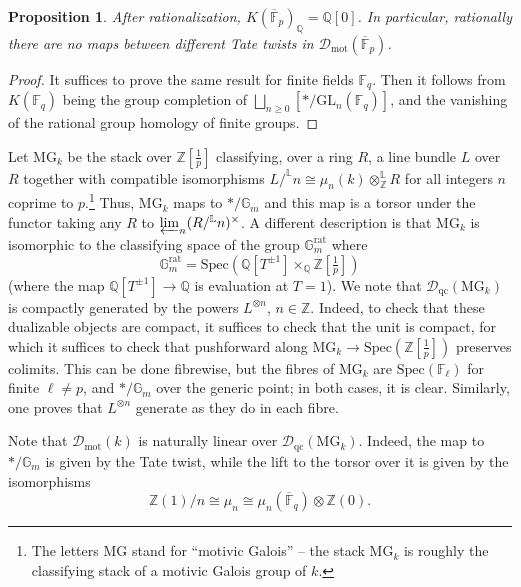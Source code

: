 \documentclass[11pt]{amsart}
\newcommand{\dotimes}{\otimes^{\mathbb L}}
\numberwithin{equation}{section}
\numberwithin{theorem}{section}
\newtheorem{proposition}[theorem]{Proposition}
\theoremstyle{definition}
\begin{document}
\begin{proposition} After rationalization, $K(\overline{\mathbb F}_p)_{\mathbb Q} = \mathbb Q[0]$. In particular, rationally there are no maps between different Tate twists in $\mathcal D_{\mathrm{mot}}(\overline{\mathbb F}_p)$.
\end{proposition}

\begin{proof} It suffices to prove the same result for finite fields $\mathbb F_q$. Then it follows from $K(\mathbb F_q)$ being the group completion of $\bigsqcup_{n\geq 0} [\ast/\mathrm{GL}_n(\mathbb F_q)]$, and the vanishing of the rational group homology of finite groups.
\end{proof}

Let $\mathrm{MG}_k$ be the stack over $\mathbb Z[\tfrac 1p]$ classifying, over a ring $R$, a line bundle $L$ over $R$ together with compatible isomorphisms $L/^{\mathbb L} n\cong \mu_n(k)\dotimes_{\mathbb Z} R$ for all integers $n$ coprime to $p$.\footnote{The letters $\mathrm{MG}$ stand for ``motivic Galois'' -- the stack $\mathrm{MG}_k$ is roughly the classifying stack of a motivic Galois group of $k$.} Thus, $\mathrm{MG}_k$ maps to $\ast/\mathbb G_m$ and this map is a torsor under the functor taking any $R$ to $\varprojlim_n (R/^{\mathbb L} n)^\times$. A different description is that $\mathrm{MG}_k$ is isomorphic to the classifying space of the group $\mathbb G_m^{\mathrm{rat}}$ where
\[
\mathbb G_m^{\mathrm{rat}} = \mathrm{Spec}(\mathbb Q[T^{\pm 1}]\times_{\mathbb Q}\mathbb Z[\tfrac 1p])
\]
(where the map $\mathbb Q[T^{\pm 1}]\to \mathbb Q$ is evaluation at $T=1$). We note that $\mathcal D_{\mathrm{qc}}(\mathrm{MG}_k)$ is compactly generated by the powers $L^{\otimes n}$, $n\in \mathbb Z$. Indeed, to check that these dualizable objects are compact, it suffices to check that the unit is compact, for which it suffices to check that pushforward along $\mathrm{MG}_k\to \mathrm{Spec}(\mathbb Z[\tfrac 1p])$ preserves colimits. This can be done fibrewise, but the fibres of $\mathrm{MG}_k$ are $\mathrm{Spec}(\mathbb F_\ell)$ for finite $\ell\neq p$, and $\ast/\mathbb G_m$ over the generic point; in both cases, it is clear. Similarly, one proves that $L^{\otimes n}$ generate as they do in each fibre.

Note that $\mathcal D_{\mathrm{mot}}(k)$ is naturally linear over $\mathcal D_{\mathrm{qc}}(\mathrm{MG}_k)$. Indeed, the map to $\ast/\mathbb G_m$ is given by the Tate twist, while the lift to the torsor over it is given by the isomorphisms
\[
\mathbb Z(1)/n\cong \mu_n\cong \mu_n(\overline{\mathbb F}_q)\otimes \mathbb Z(0).
\]
\end{document}
